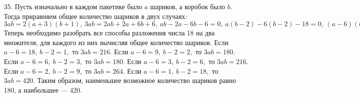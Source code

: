 35. Пусть изначально в каждом пакетике было $a$ шариков, а коробок было $b.$ Тогда приравняем общее количество шариков в двух случаях: $3ab=2(a+3)(b+1),\ 3ab=2ab+2a+6b+6,\ ab-2a-6b-6=0,\ a(b-2)-6(b-2)-18=0,\ (a-6)(b-2)=18.$ Теперь необходимо разобрать все способы разложения числа 18 на два множителя, для каждого из них вычисляя общее количество шариков. Если $a-6=18,\ b-2=1,$ то $3ab=216.$ Если $a-6=9,\ b-2=2,$ то $3ab=180.$ Если $a-6=6,\ b-2=3,$ то $3ab=180.$ Если $a-6=3,\ b-2=6,$ то $3ab=216.$ Если $a-6=2,\ b-2=9,$ то $3ab=264.$ Если $a-6=1,\ b-2=18,$ то $3ab=420.$ Таким образом, наименьшее возможное количество шариков равно 180, а наибольшее --- 420.\\
